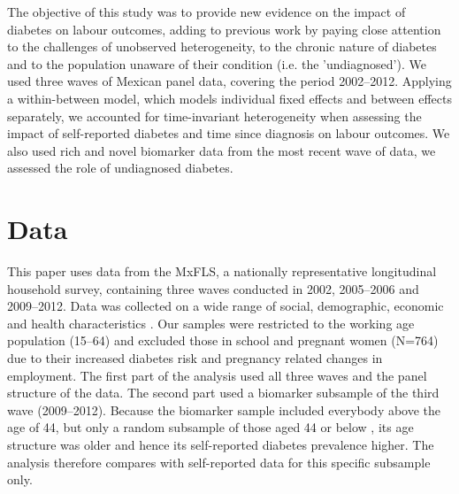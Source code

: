 \documentclass[12pt,english]{article}
\begin{document}
The objective of this study was to provide new evidence on the impact of diabetes on labour outcomes, adding to previous work by paying close attention to the challenges of unobserved heterogeneity, to the chronic nature of diabetes and to the population unaware of their condition (i.e. the 'undiagnosed'). We used three waves of Mexican panel data, covering the period 2002--2012. Applying a within-between model, which  models individual fixed effects and between effects separately, we accounted for time-invariant heterogeneity when assessing the impact of self-reported diabetes and time since diagnosis on labour outcomes. We also used rich and novel biomarker data from the most recent wave of data, we assessed the role of undiagnosed diabetes.

\section{\label{sec:Data}Data}

This paper uses data from the \acf{MxFLS}, a nationally representative longitudinal household survey, containing three waves conducted in 2002, 2005--2006 and 2009--2012. Data was collected on a wide range of social, demographic, economic and health characteristics \parencite{Rubalcava2013}. Our samples were restricted to the working age population (15--64) and excluded those in school and pregnant women (N=764) due to their increased diabetes risk and pregnancy related changes in employment. The first part of the analysis used all three waves and the panel structure of the data. The second part used a biomarker subsample of the third wave (2009--2012). Because the biomarker sample included everybody above the age of 44, but only a random subsample of those aged 44 or below \parencite{Crimmins2015}, its age structure was older and hence its self-reported diabetes prevalence higher. The analysis therefore compares with self-reported data for this specific subsample only.
\end{document}
